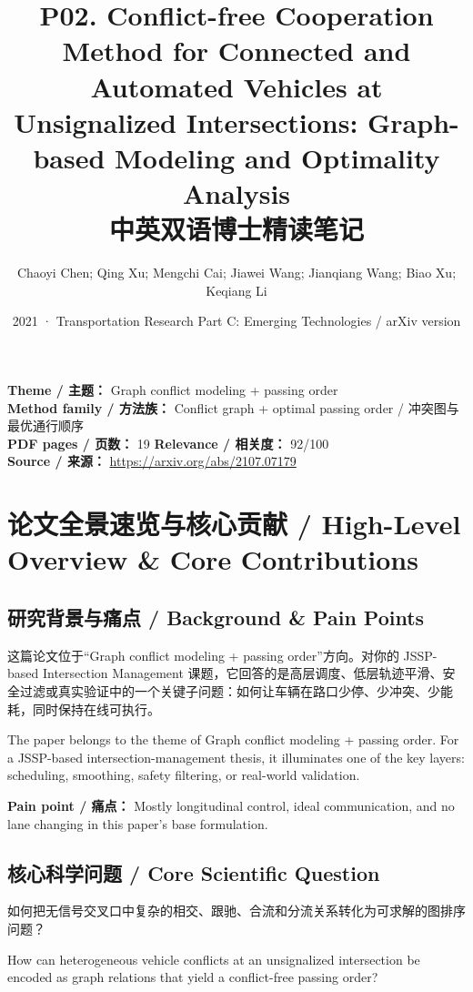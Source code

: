 \documentclass[UTF8,a4paper,11pt,fontset=fandol]{ctexart}
\title{P02. Conflict-free Cooperation Method for Connected and Automated Vehicles at Unsignalized Intersections: Graph-based Modeling and Optimality Analysis\\中英双语博士精读笔记}
\author{Chaoyi Chen; Qing Xu; Mengchi Cai; Jiawei Wang; Jianqiang Wang; Biao Xu; Keqiang Li}
\date{2021 · Transportation Research Part C: Emerging Technologies / arXiv version}
\begin{document}
\maketitle

\noindent\textbf{Theme / 主题：} Graph conflict modeling + passing order\\
\textbf{Method family / 方法族：} Conflict graph + optimal passing order / 冲突图与最优通行顺序\\
\textbf{PDF pages / 页数：} 19 \quad
\textbf{Relevance / 相关度：} 92/100\\
\textbf{Source / 来源：} \url{https://arxiv.org/abs/2107.07179}

\section{论文全景速览与核心贡献 / High-Level Overview \& Core Contributions}
\subsection{研究背景与痛点 / Background \& Pain Points}
这篇论文位于“Graph conflict modeling + passing order”方向。对你的 JSSP-based Intersection Management 课题，它回答的是高层调度、低层轨迹平滑、安全过滤或真实验证中的一个关键子问题：如何让车辆在路口少停、少冲突、少能耗，同时保持在线可执行。

The paper belongs to the theme of Graph conflict modeling + passing order. For a JSSP-based intersection-management thesis, it illuminates one of the key layers: scheduling, smoothing, safety filtering, or real-world validation.

\textbf{Pain point / 痛点：} Mostly longitudinal control, ideal communication, and no lane changing in this paper's base formulation.

\subsection{核心科学问题 / Core Scientific Question}
如何把无信号交叉口中复杂的相交、跟驰、合流和分流关系转化为可求解的图排序问题？

How can heterogeneous vehicle conflicts at an unsignalized intersection be encoded as graph relations that yield a conflict-free passing order?
\end{document}
